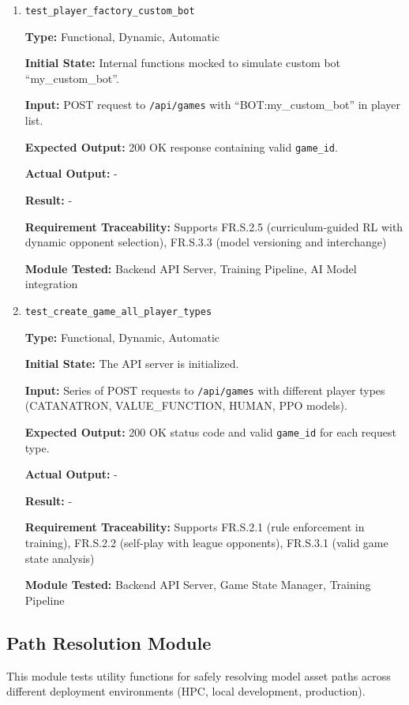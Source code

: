 \documentclass[12pt, titlepage]{article}
\begin{document}
\begin{enumerate}
\item \texttt{test\_player\_factory\_custom\_bot}

\textbf{Type:} Functional, Dynamic, Automatic

\textbf{Initial State:} Internal functions mocked to simulate custom bot ``my\_custom\_bot''.

\textbf{Input:} POST request to \texttt{/api/games} with ``BOT:my\_custom\_bot'' in player list.

\textbf{Expected Output:} 200 OK response containing valid \texttt{game\_id}.

\textbf{Actual Output:} -

\textbf{Result:} -

\textbf{Requirement Traceability:} Supports FR.S.2.5 (curriculum-guided RL with dynamic opponent selection), FR.S.3.3 (model versioning and interchange)

\textbf{Module Tested:} Backend API Server, Training Pipeline, AI Model integration


\item \texttt{test\_create\_game\_all\_player\_types}

\textbf{Type:} Functional, Dynamic, Automatic

\textbf{Initial State:} The API server is initialized.

\textbf{Input:} Series of POST requests to \texttt{/api/games} with different player types (CATANATRON, VALUE\_FUNCTION, HUMAN, PPO models).

\textbf{Expected Output:} 200 OK status code and valid \texttt{game\_id} for each request type.

\textbf{Actual Output:} -

\textbf{Result:} -

\textbf{Requirement Traceability:} Supports FR.S.2.1 (rule enforcement in training), FR.S.2.2 (self-play with league opponents), FR.S.3.1 (valid game state analysis)

\textbf{Module Tested:} Backend API Server, Game State Manager, Training Pipeline

\end{enumerate}

\subsection{Path Resolution Module}

This module tests utility functions for safely resolving model asset paths across different deployment environments (HPC, local development, production).
\end{document}
